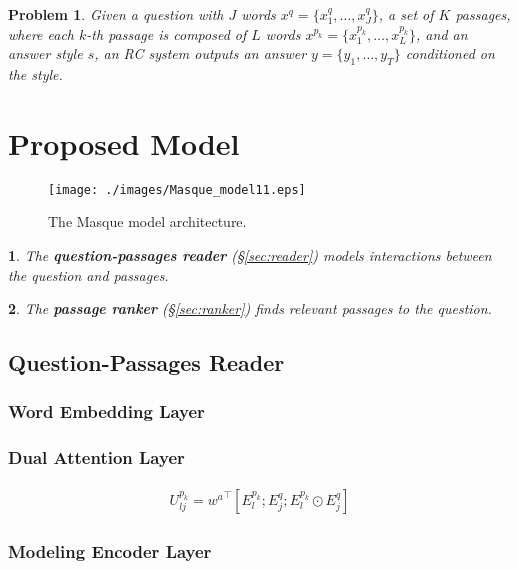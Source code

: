 \documentclass[11pt,a4paper]{article}
\theoremstyle{mydef}
\theoremstyle{myprob}
\newtheorem{problem}{Problem}
\newtheorem{layer1}{}
\begin{document}
\begin{problem}
\label{prob:prob}
Given a question with $J$ words $x^q = \{x^q_1, \ldots, x^q_J\}$, a set of $K$ passages, where each $k$-th passage is composed of $L$ words $x^{p_k} = \{x^{p_k}_1, \ldots, x^{p_k}_{L}\}$, and an answer style $s$, an RC system
outputs an answer $y = \{y_1, \ldots, y_T \}$ conditioned on the style.
\end{problem}

\section{Proposed Model}

\begin{figure}[t!]
\centering
\texttt{[image: ./images/Masque\_model11.eps]}
\caption{The Masque model architecture.}
\label{fig:model}
\end{figure}

\begin{layer1}
The \textbf{question-passages reader} (\S\ref{sec:reader}) models interactions between the question and passages.
\end{layer1}

\begin{layer1}
The \textbf{passage ranker} (\S\ref{sec:ranker}) finds relevant passages to the question.
\end{layer1}

\subsection{Question-Passages Reader}

\subsubsection{Word Embedding Layer}

\subsubsection{Dual Attention Layer}

\begin{align}
U^{p_k}_{lj} = {w^a}^\top [ E^{p_k}_l; E^q_j; E^{p_k}_l \odot E^q_j ]
\end{align}

\subsubsection{Modeling Encoder Layer}
\end{document}
